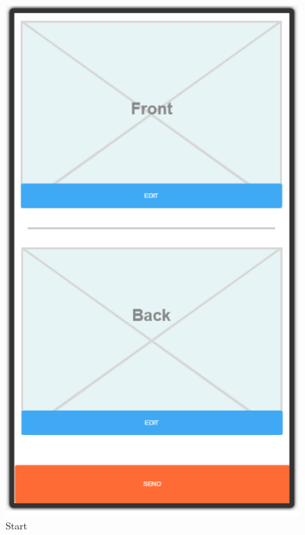 \documentclass[10pt,a4paper]{article}
\begin{document}
\begin {description}
\begin{figure}
	\begin{minipage}{0.35\textwidth}
		\includegraphics[width=\linewidth]{Prototype_img/p1.png}
		\caption{Start}
		\label{fig:p1}
	\end{minipage}
	\begin{minipage}{0.35\textwidth}

\end{minipage}
\end{figure}
\end{description}
\end{document}
